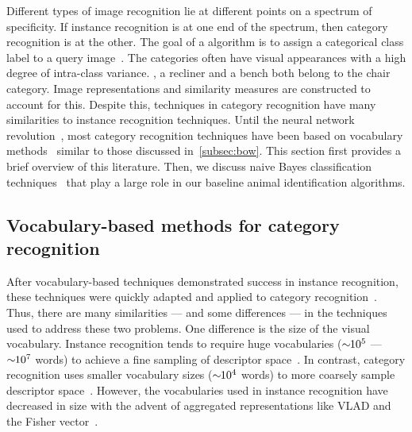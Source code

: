     Different types of image recognition lie at different points on a spectrum of specificity. If instance
    recognition is at one end of the spectrum, then category recognition is at the other. The goal of a
     algorithm is to assign a categorical class label to a query
    image~\cite{everingham_pascal_2010, everingham_pascal_2015, russakovsky_imagenet_2015, deng_imagenet_2009,
    fei_fei_one_shot_2006, griffin_caltech_256_2007}. The categories often have visual appearances with a high
    degree of intra-class variance. \Eg{}, a recliner and a bench both belong to the chair category. Image
    representations and similarity measures are constructed to account for this. Despite this, techniques in
    category recognition have many similarities to instance recognition techniques. Until the neural network
    revolution~\cite{krizhevsky_imagenet_2012}, most category recognition techniques have been based on vocabulary
    methods~\cite{csurka_visual_2004, yang_linear_2009, sanchez_compressed_2013, russakovsky_imagenet_2015,
    krizhevsky_imagenet_2012} similar to those discussed in~\cref{subsec:bow}. This section first provides a brief
    overview of this literature. Then, we discuss naive Bayes classification
    techniques~\cite{boiman_defense_2008,mccann_local_2012} that play a large role in our baseline animal
    identification algorithms.

    \subsection{Vocabulary-based methods for category recognition}
        After vocabulary-based techniques demonstrated success in instance recognition, these techniques were
        quickly adapted and applied to category recognition~\cite{csurka_visual_2004}. Thus, there are many
        similarities --- and some differences --- in the techniques used to address these two problems. One
        difference is the size of the visual vocabulary. Instance recognition tends to require huge vocabularies
        ($\sim\mkern-6mu 10^{5}$ --- $\sim\mkern-6mu 10^{7}$ words) to achieve a fine sampling of descriptor
        space~\cite{nister_scalable_2006, philbin_object_2007}. In contrast, category recognition uses smaller
        vocabulary sizes ($\sim\mkern-6mu 10^{4}$ words) to more coarsely sample descriptor
        space~\cite{zhang_local_2006}. However, the vocabularies used in instance recognition have decreased in
        size with the advent of aggregated representations like VLAD and the Fisher
        vector~\cite{arandjelovic_all_2013, sanchez_compressed_2013}.

